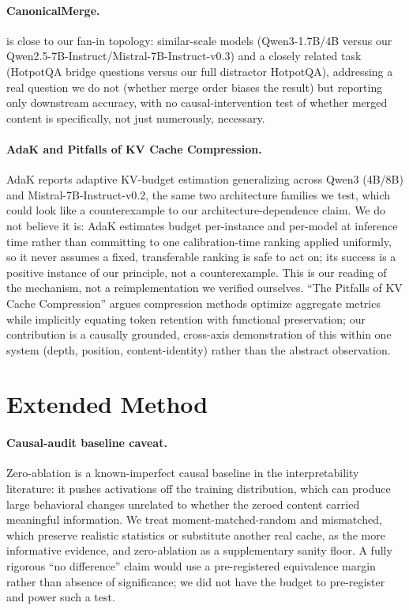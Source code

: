 \documentclass[11pt]{article}
\begin{document}
\paragraph{CanonicalMerge.} \citep{canonicalmerge2026} is close to our
fan-in topology: similar-scale models (Qwen3-1.7B/4B versus our
Qwen2.5-7B-Instruct/Mistral-7B-Instruct-v0.3) and a closely related task
(HotpotQA bridge questions versus our full distractor HotpotQA),
addressing a real question we do not (whether merge order biases the
result) but reporting only downstream accuracy, with no
causal-intervention test of whether merged content is specifically, not
just numerously, necessary.

\paragraph{AdaK and Pitfalls of KV Cache Compression.} AdaK
\citep{adak2026} reports adaptive KV-budget estimation generalizing
across Qwen3 (4B/8B) and Mistral-7B-Instruct-v0.2, the same two
architecture families we test, which could look like a counterexample to
our architecture-dependence claim.
We do not believe it is: AdaK estimates budget per-instance and
per-model at inference time rather than committing to one
calibration-time ranking applied uniformly, so it never assumes a
fixed, transferable ranking is safe to act on; its success is a
positive instance of our principle, not a counterexample. This is our
reading of the mechanism, not a reimplementation we verified ourselves.
``The Pitfalls of KV Cache Compression'' \citep{pitfallskv2026} argues
compression methods optimize aggregate metrics while implicitly
equating token retention with functional preservation; our contribution
is a causally grounded, cross-axis demonstration of this within one
system (depth, position, content-identity) rather than the abstract
observation.

\section{Extended Method}
\label{app:method-ext}

\paragraph{Causal-audit baseline caveat.} Zero-ablation is a
known-imperfect causal baseline in the interpretability literature: it
pushes activations off the training distribution, which can produce
large behavioral changes unrelated to whether the zeroed content
carried meaningful information. We treat moment-matched-random and
mismatched, which preserve realistic statistics or substitute another
real cache, as the more informative evidence, and zero-ablation as a
supplementary sanity floor. A fully rigorous ``no difference'' claim
would use a pre-registered equivalence margin rather than absence of
significance; we did not have the budget to pre-register and power such
a test.
\end{document}

